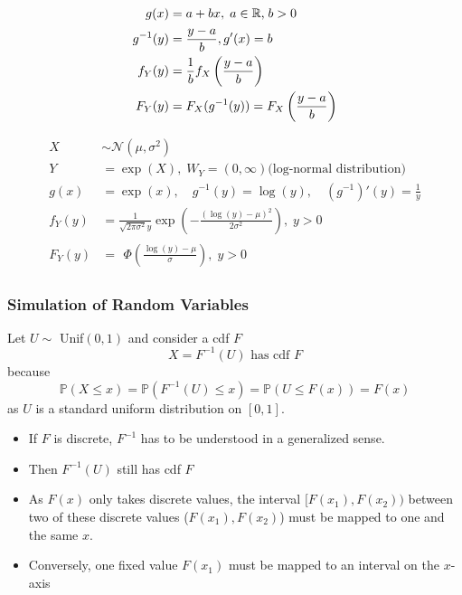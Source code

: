 \begin{align*}
    g(x)      & =a+bx,\;a\in\mathbb{R}\text,\;b>0           \\
    g^{-1}(y) & =\frac{y-a}b, g'(x)=b                       \\
    f_Y(y)    & =\frac1bf_X\left(\frac{y-a}b\right)         \\
    F_Y(y)    & =F_X(g^{-1}(y))=F_X\left(\frac{y-a}b\right)
\end{align*}

\begin{align*}
    X      & \sim\mathcal{N}(\mu,\sigma^2)                                                              \\
    Y      & =\exp(X),\;W_Y=(0,\infty) \text{(log-normal distribution)}                                 \\
    g(x)   & =\exp(x),\quad g^{-1}(y)=\log(y),\quad(g^{-1})'(y)=\frac{1}{y}                             \\
    f_Y(y) & =\frac{1}{\sqrt{2\pi\sigma^2}y}\exp\left(-\frac{{(\log(y)-\mu)}^2}{2\sigma^2}\right),\;y>0 \\
    F_Y(y) & =\begin{aligned}\Phi\left(\frac{\log(y)-\mu}\sigma\right),\;y>0\end{aligned}
\end{align*}

\subsubsection{Simulation of Random Variables}

Let $U\sim$ Unif$(0,1)$ and consider a cdf $F$
\begin{equation*}
    X=F^{-1}(U) \text{ has cdf }F
\end{equation*}
because
\noindent\begin{equation*}
    \mathbb{P}(X\leq x)=\mathbb{P}(F^{-1}(U)\leq x)=\mathbb{P}(U\leq F(x))=F(x)
\end{equation*}
as $U$ is a standard uniform distribution on $[0,1]$.


\begin{itemize}
    \item If $F$ is discrete, $F^{-1}$ has to be understood in a generalized sense.
    \item Then $F^{-1}(U)$ still has cdf $F$
    \item As $F(x)$ only takes discrete values, the interval $[F(x_1), F(x_2))$ between two of these discrete values ($F(x_1), F(x_2)$) must be mapped to one and the same $x$. %
    \item Conversely, one fixed value $F(x_1)$ must be mapped to an interval on the $x$-axis
\end{itemize}

